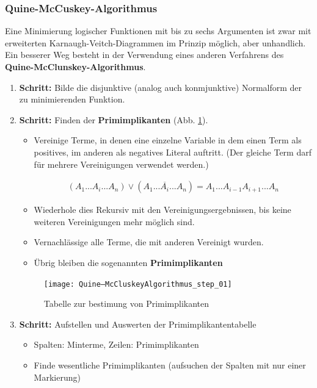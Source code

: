 \documentclass[12pt]{report}
\begin{document}
\subsubsection{Quine-McCuskey-Algorithmus}
Eine Minimierung logischer Funktionen mit bis zu sechs Argumenten ist zwar mit erweiterten 
Karnaugh-Veitch-Diagrammen im Prinzip möglich, aber unhandlich. Ein besserer Weg besteht 
in der Verwendung eines anderen Verfahrens des \textbf{Quine-McClunskey-Algorithmus}.

\begin{enumerate}
  \item \textbf{Schritt:} Bilde die disjunktive (analog auch konmjunktive) Normalform der zu minimierenden Funktion.
  \item \textbf{Schritt:} Finden der \textbf{Primimplikanten} (Abb. \ref{fig:Quine–McCluskeyAlgorithmus_step_01}).
        \begin{itemize}
          \item Vereinige Terme, in denen eine einzelne Variable
                in dem einen Term als positives, im anderen als negatives Literal auftritt.
                (Der gleiche Term darf für mehrere Vereinigungen verwendet werden.)
                
                \begin{align*}
                  (A_1 ... A_i ... A_n) \vee (A_1 ... \overline{A_i} ... A_n) = A_1 ... A_{i-1} A_{i+1} ... A_n                                  
                \end{align*}
          \item Wiederhole dies Rekursiv mit den Vereinigungsergebnissen, bis keine weiteren Vereinigungen mehr möglich sind.
          \item Vernachlässige alle Terme, die mit anderen Vereinigt wurden.
          \item Übrig bleiben die sogenannten \textbf{Primimplikanten}
        \end{itemize}
        
        \begin{figure}[H]
          \caption{Tabelle zur bestimung von Primimplikanten}
          \label{fig:Quine–McCluskeyAlgorithmus_step_01}
          \centering
          \texttt{[image: Quine–McCluskeyAlgorithmus\_step\_01]}
        \end{figure}
        
  \item \textbf{Schritt:} Aufstellen und Auswerten der Primimplikantentabelle
        \begin{itemize}
          \item Spalten: Minterme, Zeilen: Primimplikanten
          \item Finde wesentliche Primimplikanten (aufsuchen der Spalten mit nur einer Markierung)
                

\end{itemize}
\end{enumerate}
\end{document}
